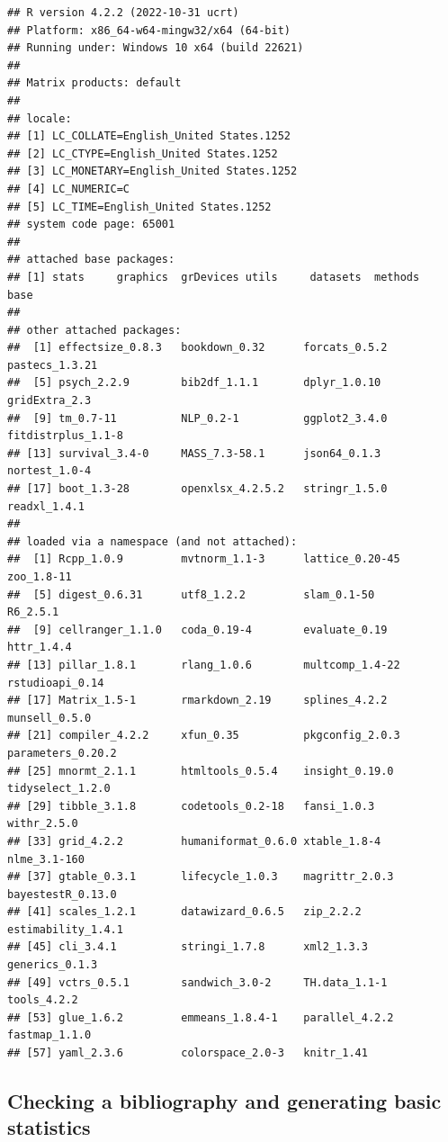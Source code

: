 \documentclass[
]{article}
\begin{document}
\begin{verbatim}
## R version 4.2.2 (2022-10-31 ucrt)
## Platform: x86_64-w64-mingw32/x64 (64-bit)
## Running under: Windows 10 x64 (build 22621)
## 
## Matrix products: default
## 
## locale:
## [1] LC_COLLATE=English_United States.1252 
## [2] LC_CTYPE=English_United States.1252   
## [3] LC_MONETARY=English_United States.1252
## [4] LC_NUMERIC=C                          
## [5] LC_TIME=English_United States.1252    
## system code page: 65001
## 
## attached base packages:
## [1] stats     graphics  grDevices utils     datasets  methods   base     
## 
## other attached packages:
##  [1] effectsize_0.8.3   bookdown_0.32      forcats_0.5.2      pastecs_1.3.21    
##  [5] psych_2.2.9        bib2df_1.1.1       dplyr_1.0.10       gridExtra_2.3     
##  [9] tm_0.7-11          NLP_0.2-1          ggplot2_3.4.0      fitdistrplus_1.1-8
## [13] survival_3.4-0     MASS_7.3-58.1      json64_0.1.3       nortest_1.0-4     
## [17] boot_1.3-28        openxlsx_4.2.5.2   stringr_1.5.0      readxl_1.4.1      
## 
## loaded via a namespace (and not attached):
##  [1] Rcpp_1.0.9         mvtnorm_1.1-3      lattice_0.20-45    zoo_1.8-11        
##  [5] digest_0.6.31      utf8_1.2.2         slam_0.1-50        R6_2.5.1          
##  [9] cellranger_1.1.0   coda_0.19-4        evaluate_0.19      httr_1.4.4        
## [13] pillar_1.8.1       rlang_1.0.6        multcomp_1.4-22    rstudioapi_0.14   
## [17] Matrix_1.5-1       rmarkdown_2.19     splines_4.2.2      munsell_0.5.0     
## [21] compiler_4.2.2     xfun_0.35          pkgconfig_2.0.3    parameters_0.20.2 
## [25] mnormt_2.1.1       htmltools_0.5.4    insight_0.19.0     tidyselect_1.2.0  
## [29] tibble_3.1.8       codetools_0.2-18   fansi_1.0.3        withr_2.5.0       
## [33] grid_4.2.2         humaniformat_0.6.0 xtable_1.8-4       nlme_3.1-160      
## [37] gtable_0.3.1       lifecycle_1.0.3    magrittr_2.0.3     bayestestR_0.13.0 
## [41] scales_1.2.1       datawizard_0.6.5   zip_2.2.2          estimability_1.4.1
## [45] cli_3.4.1          stringi_1.7.8      xml2_1.3.3         generics_0.1.3    
## [49] vctrs_0.5.1        sandwich_3.0-2     TH.data_1.1-1      tools_4.2.2       
## [53] glue_1.6.2         emmeans_1.8.4-1    parallel_4.2.2     fastmap_1.1.0     
## [57] yaml_2.3.6         colorspace_2.0-3   knitr_1.41
\end{verbatim}

\hypertarget{checking-a-bibliography-and-generating-basic-statistics}{%
\subsection{Checking a bibliography and generating basic statistics}\label{checking-a-bibliography-and-generating-basic-statistics}}
\end{document}
